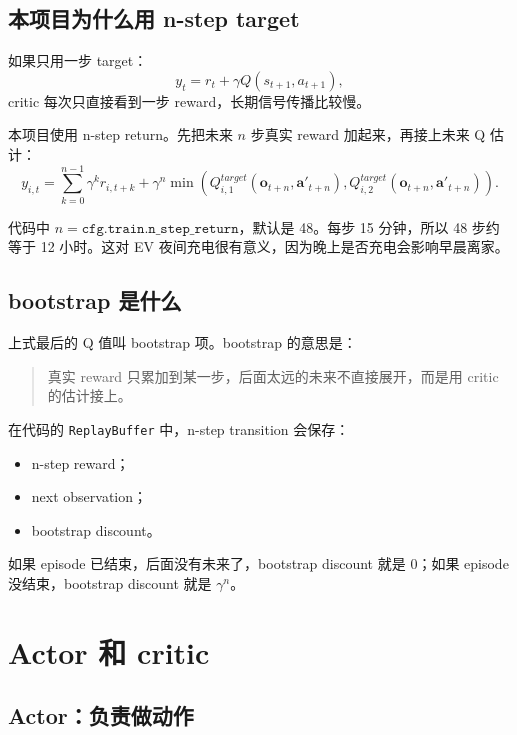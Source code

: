 \documentclass[UTF8,zihao=-4]{ctexart}
\begin{document}
\subsection{本项目为什么用 n-step target}

如果只用一步 target：
\begin{equation}
y_t=r_t+\gamma Q(s_{t+1},a_{t+1}),
\end{equation}
critic 每次只直接看到一步 reward，长期信号传播比较慢。

本项目使用 n-step return。先把未来 $n$ 步真实 reward 加起来，再接上未来 Q 估计：
\begin{equation}
y_{i,t}
=
\sum_{k=0}^{n-1}\gamma^k r_{i,t+k}
+
\gamma^n
\min
\left(
Q^{target}_{i,1}(\bm{o}_{t+n},\bm{a}'_{t+n}),
Q^{target}_{i,2}(\bm{o}_{t+n},\bm{a}'_{t+n})
\right).
\end{equation}

代码中 $n=\texttt{cfg.train.n\_step\_return}$，默认是 48。每步 15 分钟，所以 48 步约等于 12 小时。这对 EV 夜间充电很有意义，因为晚上是否充电会影响早晨离家。

\subsection{bootstrap 是什么}

上式最后的 Q 值叫 bootstrap 项。bootstrap 的意思是：
\begin{quote}
真实 reward 只累加到某一步，后面太远的未来不直接展开，而是用 critic 的估计接上。
\end{quote}

在代码的 \texttt{ReplayBuffer} 中，n-step transition 会保存：
\begin{itemize}
  \item n-step reward；
  \item next observation；
  \item bootstrap discount。
\end{itemize}

如果 episode 已结束，后面没有未来了，bootstrap discount 就是 0；如果 episode 没结束，bootstrap discount 就是 $\gamma^n$。

\section{Actor 和 critic}

\subsection{Actor：负责做动作}
\end{document}
